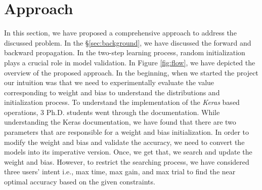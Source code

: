 \section{Approach}
\label{sec:approach}
In this section, we have proposed a comprehensive approach to address the discussed problem. 
In the \S\ref{sec:background}, we have discussed the forward and backward propagation. In the two-step learning process, random initialization plays a crucial role in model validation. 
In Figure \ref{fig:flow}, we have depicted the overview of the proposed approach. In the beginning, when we started the project our intuition was that we need to experimentally evaluate the value corresponding to weight and bias to understand the distributions and initialization process. To understand the implementation of the \emph{Keras} based operations, 3 Ph.D. students went through the documentation. While understanding the Keras documentation, we have found that there are two parameters that are responsible for a weight and bias initialization. In order to modify the weight and bias and validate the accuracy, we need to convert the models into its imperative version. Once, we get that, we search and update the weight and bias. However, to restrict the searching process, we have considered three users’ intent i.e., max time, max gain, and max trial to find the near optimal accuracy based on the given constraints.

